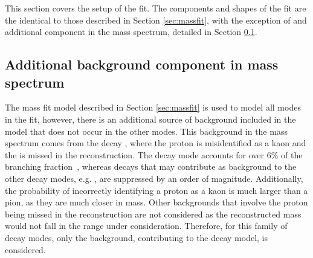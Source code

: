 This section covers the setup of the \CP fit. The components and shapes of the \CP fit are the identical to those described in Section \ref{sec:massfit}, with the exception of and additional component in the \kk mass spectrum, detailed in Section \ref{sec:cpfit:Lb2LcKst}.



\subsection{Additional background component in \kk mass spectrum}
\label{sec:cpfit:Lb2LcKst}

The mass fit model described in Section \ref{sec:massfit} is used to model all \Dz modes in the \CP fit, however, there is an additional source of background included in the \kk model that does not occur in the other modes. This background in the \kk \Bm mass spectrum comes from the decay , where the proton is misidentified as a kaon and the \pion is missed in the reconstruction. The decay mode  accounts for over 6\% of the \Lc branching fraction~\cite{PDG2016}, whereas \Lc decays that may contribute as background to the other \Dz decay modes, e.g. , are suppressed by an order of magnitude. Additionally, the probability of incorrectly identifying a proton as a kaon is much larger than a pion, as they are much closer in mass. Other backgrounds that involve the proton being missed in the reconstruction are not considered as the reconstructed \Bm mass would not fall in the range under consideration. Therefore, for this family of decay modes, only the  background, contributing to the \kk decay model, is considered.

